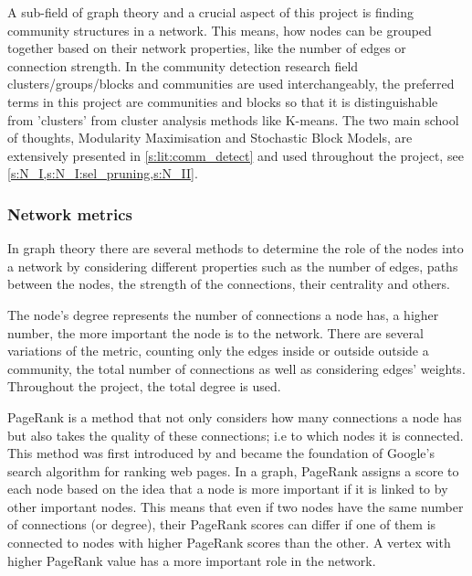 A sub-field of graph theory and a crucial aspect of this project is finding community structures in a network. This means, how nodes can be grouped together based on their network properties, like the number of edges or connection strength. In the community detection research field clusters/groups/blocks and communities are used interchangeably, the preferred terms in this project are communities and blocks so that it is distinguishable from 'clusters' from cluster analysis methods like K-means. The two main school of thoughts, Modularity Maximisation and Stochastic Block Models, are extensively presented in \cref{s:lit:comm_detect} and used throughout the project, see \cref{s:N_I,s:N_I:sel_pruning,s:N_II}.




\subsubsection*{Network metrics} \label{s:lit:net_metrics}

In graph theory there are several methods to determine the role of the nodes into a network by considering different properties such as the number of edges, paths between the nodes, the strength of the connections, their centrality and others.

The node's degree represents the number of connections a node has, a higher number, the more important the node is to the network. There are several variations of the metric, counting only the edges inside or outside outside a community, the total number of connections as well as considering edges' weights. Throughout the project, the total degree is used.

PageRank is a method that not only considers how many connections a node has but also takes the quality of these connections; i.e to which nodes it is connected. This method was first introduced by \citep{Brin1998-mc} and became the foundation of Google's search algorithm for ranking web pages. In a graph, PageRank assigns a score to each node based on the idea that a node is more important if it is linked to by other important nodes. This means that even if two nodes have the same number of connections (or degree), their PageRank scores can differ if one of them is connected to nodes with higher PageRank scores than the other. A vertex with higher PageRank value has a more important role in the network.

